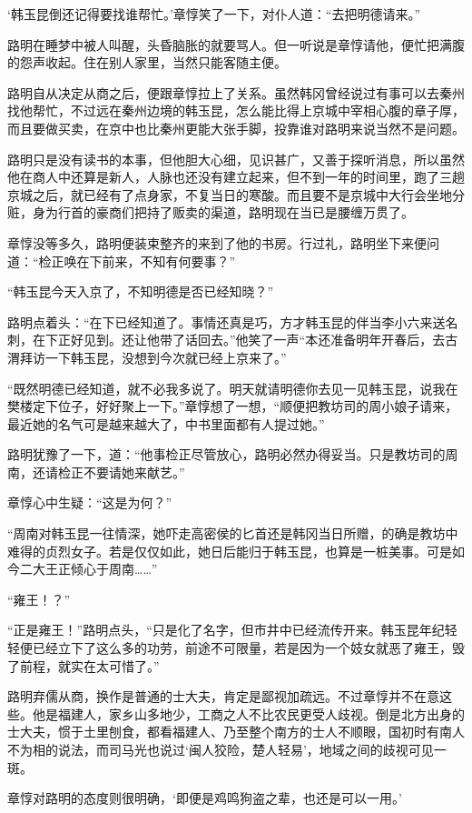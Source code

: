 ‘韩玉昆倒还记得要找谁帮忙。’章惇笑了一下，对仆人道：“去把明德请来。”

路明在睡梦中被人叫醒，头昏脑胀的就要骂人。但一听说是章惇请他，便忙把满腹的怨声收起。住在别人家里，当然只能客随主便。

路明自从决定从商之后，便跟章惇拉上了关系。虽然韩冈曾经说过有事可以去秦州找他帮忙，不过远在秦州边境的韩玉昆，怎么能比得上京城中宰相心腹的章子厚，而且要做买卖，在京中也比秦州更能大张手脚，投靠谁对路明来说当然不是问题。

路明只是没有读书的本事，但他胆大心细，见识甚广，又善于探听消息，所以虽然他在商人中还算是新人，人脉也还没有建立起来，但不到一年的时间里，跑了三趟京城之后，就已经有了点身家，不复当日的寒酸。而且要不是京城中大行会坐地分赃，身为行首的豪商们把持了贩卖的渠道，路明现在当已是腰缠万贯了。

章惇没等多久，路明便装束整齐的来到了他的书房。行过礼，路明坐下来便问道：“检正唤在下前来，不知有何要事？”

“韩玉昆今天入京了，不知明德是否已经知晓？”

路明点着头：“在下已经知道了。事情还真是巧，方才韩玉昆的伴当李小六来送名刺，在下正好见到。还让他带了话回去。”他笑了一声“本还准备明年开春后，去古渭拜访一下韩玉昆，没想到今次就已经上京来了。”

“既然明德已经知道，就不必我多说了。明天就请明德你去见一见韩玉昆，说我在樊楼定下位子，好好聚上一下。”章惇想了一想，“顺便把教坊司的周小娘子请来，最近她的名气可是越来越大了，中书里面都有人提过她。”

路明犹豫了一下，道：“他事检正尽管放心，路明必然办得妥当。只是教坊司的周南，还请检正不要请她来献艺。”

章惇心中生疑：“这是为何？”

“周南对韩玉昆一往情深，她吓走高密侯的匕首还是韩冈当日所赠，的确是教坊中难得的贞烈女子。若是仅仅如此，她日后能归于韩玉昆，也算是一桩美事。可是如今二大王正倾心于周南……”

“雍王！？”

“正是雍王！”路明点头，“只是化了名字，但市井中已经流传开来。韩玉昆年纪轻轻便已经立下了这么多的功劳，前途不可限量，若是因为一个妓女就恶了雍王，毁了前程，就实在太可惜了。”

路明弃儒从商，换作是普通的士大夫，肯定是鄙视加疏远。不过章惇并不在意这些。他是福建人，家乡山多地少，工商之人不比农民更受人歧视。倒是北方出身的士大夫，惯于土里刨食，都看福建人、乃至整个南方的士人不顺眼，国初时有南人不为相的说法，而司马光也说过‘闽人狡险，楚人轻易’，地域之间的歧视可见一斑。

章惇对路明的态度则很明确，‘即便是鸡鸣狗盗之辈，也还是可以一用。’

